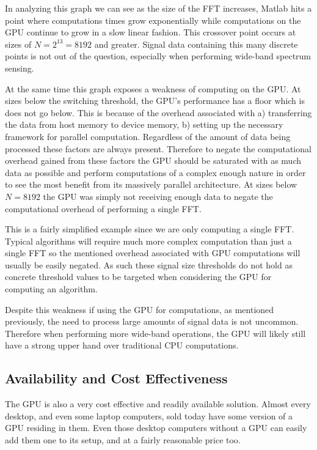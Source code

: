 In analyzing this graph we can see as the size of the FFT increases, Matlab hits a point where computations times grow exponentially while computations on the GPU continue to grow in a slow linear fashion.  This crossover point occurs at sizes of $N = 2^13 = 8192$ and greater.  Signal data containing this many discrete points is not out of the question, especially when performing wide-band spectrum sensing.  

At the same time this graph exposes a weakness of computing on the GPU.  At sizes below the switching threshold, the GPU's performance has a floor which is does not go below.  This is because of the overhead associated with a) transferring the data from host memory to device memory, b) setting up the necessary framework for parallel computation.  Regardless of the amount of data being processed these factors are always present. Therefore to negate the computational overhead gained from these factors the GPU should be saturated with as much data as possible and perform computations of a complex enough nature in order to see the most benefit from its massively parallel architecture.  At sizes below $N = 8192$ the GPU was simply not receiving enough data to negate the computational overhead of performing a single FFT.

This is a fairly simplified example since we are only computing a single FFT.  Typical algorithms will require much more complex computation than just a single FFT so the mentioned overhead associated with GPU computations will usually be easily negated.  As such these signal size thresholds do not hold as concrete threshold values to be targeted when considering the GPU for computing an algorithm.

Despite this weakness if using the GPU for computations, as mentioned previously, the need to process large amounts of signal data is not uncommon.  Therefore when performing more wide-band operations, the GPU will likely still have a strong upper hand over traditional CPU computations.

\subsection{Availability and Cost Effectiveness}
The GPU is also a very cost effective and readily available solution.  Almost every desktop, and even some laptop computers, sold today have some version of a GPU residing in them.  Even those desktop computers without a GPU can easily add them one to its setup, and at a fairly reasonable price too.  

